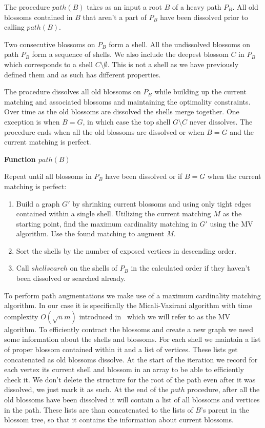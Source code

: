 The procedure $path(B)$ takes as an input a root $B$ of a heavy path $P_B$. All old blossoms contained in $B$ that aren't a part of $P_B$ have been dissolved prior to calling $path(B)$. 

Two consecutive blossoms on $P_B$ form a shell. All the undissolved blossoms on path $P_B$ form a sequence of shells. We also include the deepest blossom $C$ in $P_B$ which corresponds to a shell $C \setminus \emptyset$. This is not a shell as we have previously defined them and as such has different properties. 

The procedure dissolves all old blossoms on $P_B$ while building up the current matching and associated blossoms and maintaining the optimality constraints. Over time as the old blossoms are dissolved the shells merge together. One exception is when $B = G$, in which case the top shell $G \setminus C$ never dissolves. The procedure ends when all the old blossoms are dissolved or when $B = G$ and the current matching is perfect.

\textbf{Function $path(B)$}

Repeat until all blossoms in $P_B$ have been dissolved or if $B = G$ when the current matching is perfect:
\begin{enumerate}
    \item Build a graph $G'$ by shrinking current blossoms and using only tight edges contained within a single shell. Utilizing the current matching $M$ as the starting point, find the maximum cardinality matching in $G'$ using the MV algorithm. Use the found matching to augment $M$.
    \item Sort the shells by the number of exposed vertices in descending order.
    \item Call $shellsearch$ on the shells of $P_B$ in the calculated order if they haven't been dissolved or searched already.
\end{enumerate}

To perform path augmentations we make use of a maximum cardinality matching algorithm. In our case it is specifically the Micali-Vazirani algorithm with time complexity $O(\sqrt{n}m)$ introduced in~\cite{micali1980v} which we will refer to as the MV algorithm. To efficiently contract the blossoms and create a new graph we need some information about the shells and blossoms. For each shell we maintain a list of proper blossom contained within it and a list of vertices. These lists get concatenated as old blossoms dissolve. At the start of the iteration we record for each vertex its current shell and blossom in an array to be able to efficiently check it. We don't delete the structure for the root of the path even after it was dissolved, we just mark it as such. At the end of the $path$ procedure, after all the old blossoms have been dissolved it will contain a list of all blossoms and vertices in the path. These lists are than concatenated to the lists of $B$'s parent in the blossom tree, so that it contains the information about current blossoms.

